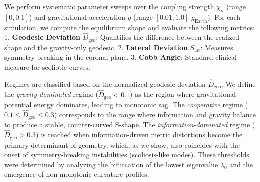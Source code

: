 \documentclass[11pt]{article}
\begin{document}
We perform systematic parameter sweeps over the coupling strength $\chi_\kappa$ (range $[0, 0.1]$) and gravitational acceleration $g$ (range $[0.01, 1.0]$ $g_{\mathrm{Earth}}$). For each simulation, we compute the equilibrium shape and evaluate the following metrics:
1.  \textbf{Geodesic Deviation} $\widehat{D}_{\mathrm{geo}}$: Quantifies the difference between the realized shape and the gravity-only geodesic.
2.  \textbf{Lateral Deviation} $S_{\mathrm{lat}}$: Measures symmetry breaking in the coronal plane.
3.  \textbf{Cobb Angle}: Standard clinical measure for scoliotic curves.

Regimes are classified based on the normalized geodesic deviation $\widehat{D}_{\mathrm{geo}}$. We define the \emph{gravity-dominated} regime ($\widehat{D}_{\mathrm{geo}} < 0.1$) as the region where gravitational potential energy dominates, leading to monotonic sag. The \emph{cooperative} regime ($0.1 \leq \widehat{D}_{\mathrm{geo}} \leq 0.3$) corresponds to the range where information and gravity balance to produce a stable, counter-curved S-shape. The \emph{information-dominated} regime ($\widehat{D}_{\mathrm{geo}} > 0.3$) is reached when information-driven metric distortions become the primary determinant of geometry, which, as we show, also coincides with the onset of symmetry-breaking instabilities (scoliosis-like modes). These thresholds were determined by analyzing the bifurcation of the lowest eigenvalue $\lambda_0$ and the emergence of non-monotonic curvature profiles.
\end{document}
